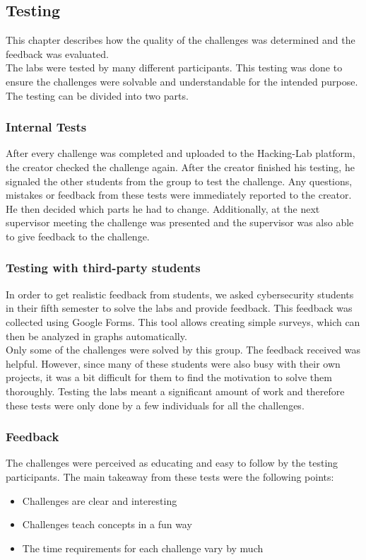 \label{sec:testing}
\subsection{Testing}
This chapter describes how the quality of the challenges was determined and the feedback was evaluated. \\
The labs were tested by many different participants. This testing was done to ensure the challenges were solvable and understandable for the intended purpose. The testing can be divided into two parts.

\subsubsection{Internal Tests}
After every challenge was completed and uploaded to the Hacking-Lab platform, the creator checked the challenge again. After the creator finished his testing, he signaled the other students from the group to test the challenge. Any questions, mistakes or feedback from these tests were immediately reported to the creator. He then decided which parts he had to change. Additionally, at the next supervisor meeting the challenge was presented and the supervisor was also able to give feedback to the challenge.

\subsubsection{Testing with third-party students}
In order to get realistic feedback from students, we asked cybersecurity students in their fifth semester to solve the labs and provide feedback. This feedback was collected using Google Forms. This tool allows creating simple surveys, which can then be analyzed in graphs automatically. \\
Only some of the challenges were solved by this group. The feedback received was helpful. However, since many of these students were also busy with their own projects, it was a bit difficult for them to find the motivation to solve them thoroughly. Testing the labs meant a significant amount of work and therefore these tests were only done by a few individuals for all the challenges.

\subsubsection{Feedback}
The challenges were perceived as educating and easy to follow by the testing participants. The main takeaway from these tests were the following points:
\begin{itemize}
    \item Challenges are clear and interesting
    \item Challenges teach concepts in a fun way
    \item The time requirements for each challenge vary by much
  \end{itemize}

